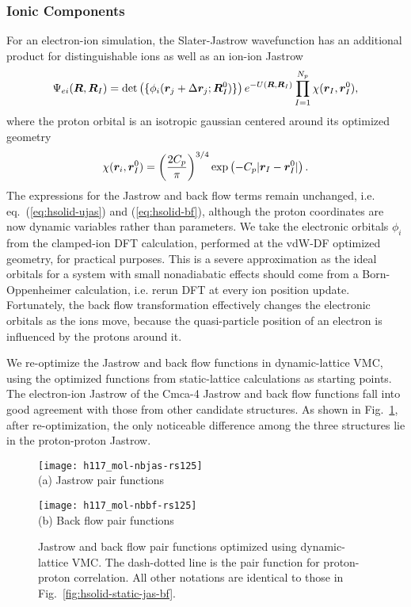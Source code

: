 \subsubsection{Ionic Components}
For an electron-ion simulation, the Slater-Jastrow wavefunction has an additional product for distinguishable ions as well as an ion-ion Jastrow
\begin{align} \label{eq:hsolid-ei-wf}
\Psi_{ei}(\boldsymbol{R}, \boldsymbol{R}_I) = \det\left( \{ \phi_i(\boldsymbol{r}_j+\Delta\boldsymbol{r}_j; \boldsymbol{R}_I^0)\} \right) e^{-U(\boldsymbol{R},\boldsymbol{R}_I)} \prod\limits_{I=1}^{N_p} \chi(\boldsymbol{r}_I, \boldsymbol{r}_I^0),
\end{align}
where the proton orbital is an isotropic gaussian centered around its optimized geometry
\begin{align}
\chi(\boldsymbol{r}_i, \boldsymbol{r}_I^0) = \left(\dfrac{2C_p}{\pi}\right)^{3/4} \exp\left(
-C_p\vert\boldsymbol{r}_I-\boldsymbol{r}_I^0\vert
\right).
\end{align}
The expressions for the Jastrow and back flow terms remain unchanged, i.e. eq.~(\ref{eq:hsolid-ujas}) and (\ref{eq:hsolid-bf}), although the proton coordinates are now dynamic variables rather than parameters.
We take the electronic orbitals $\phi_i$ from the clamped-ion DFT calculation, performed at the vdW-DF optimized geometry, for practical purposes.
This is a severe approximation as the ideal orbitals for a system with small nonadiabatic effects should come from a Born-Oppenheimer calculation, i.e. rerun DFT at every ion position update.
Fortunately, the back flow transformation effectively changes the electronic orbitals as the ions move, because the quasi-particle position of an electron is influenced by the protons around it.

We re-optimize the Jastrow and back flow functions in dynamic-lattice VMC, using the optimized functions from static-lattice calculations as starting points.
The electron-ion Jastrow of the Cmca-4 Jastrow and back flow functions fall into good agreement with those from other candidate structures.
As shown in Fig.~\ref{fig:hsolid-dynamic-jas-bf}, after re-optimization, the only noticeable difference among the three structures lie in the proton-proton Jastrow.

\begin{figure}[h]
\centering
\begin{minipage}{0.49\textwidth}
\centering
\texttt{[image: h117\_mol-nbjas-rs125]}\\
(a) Jastrow pair functions
\end{minipage}
\begin{minipage}{0.49\textwidth}
\centering
\texttt{[image: h117\_mol-nbbf-rs125]}\\
(b) Back flow pair functions
\end{minipage}
\caption{Jastrow and back flow pair functions optimized using dynamic-lattice VMC. The dash-dotted line is the pair function for proton-proton correlation. All other notations are identical to those in Fig.~\ref{fig:hsolid-static-jas-bf}.}
\label{fig:hsolid-dynamic-jas-bf}
\end{figure}

